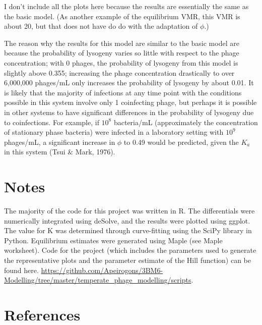 \documentclass{article}
\begin{document}
I don't include all the plots here because the results are essentially the same as the basic model. (As another example of the equilibrium VMR, this VMR is about 20, but that does not have do do with the adaptation of $\phi$.)

The reason why the results for this model are similar to the basic model are because the probability of lysogeny varies so little with respect to the phage concentration; with 0 phages, the probability of lysogeny from this model is slightly above 0.355; increasing the phage concentration drastically to over 6,000,000 phages/mL only increases the probability of lysogeny by about 0.01. It is likely that the majority of infections at any time point with the conditions possible in this system involve only 1 coinfecting phage, but perhaps it is possible in other systems to have significant differences in the probability of lysogeny due to coinfections. For example, if $10^8$ bacteria/mL (approximately the concentration of stationary phase bacteria) were infected in a laboratory setting with $10^9$ phages/mL, a significant increase in $\phi$ to 0.49 would be predicted, given the $K_a$ in this system (Tsui $\&$ Mark, 1976). 

\section{Notes}
The majority of the code for this project was written in R. The differentials were numerically integrated using deSolve, and the results were plotted using ggplot. The value for K was determined through curve-fitting using the SciPy library in Python. Equilibrium estimates were generated using Maple (see Maple worksheet). Code for the project (which includes the parameters used to generate the representative plots and the parameter estimate of the Hill function) can be found here. \url{https://github.com/Apeirogons/3BM6-Modelling/tree/master/temperate_phage_modelling/scripts}. 

\section{References}
\end{document}
